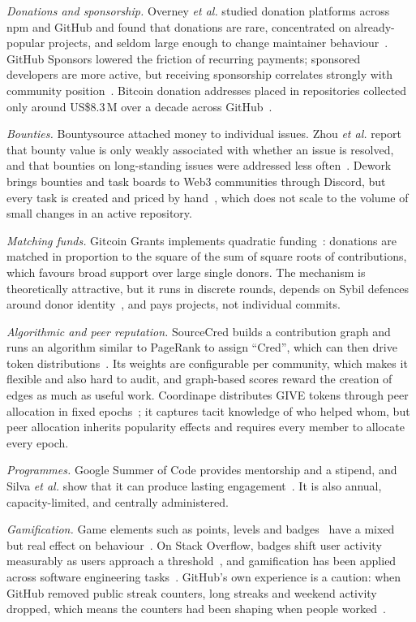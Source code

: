 \documentclass[conference]{IEEEtran}
\begin{document}
\textit{Donations and sponsorship.} Overney \textit{et al.} studied donation platforms across npm and GitHub and found that donations are rare, concentrated on already-popular projects, and seldom large enough to change maintainer behaviour~\cite{overney2020donations}. GitHub Sponsors lowered the friction of recurring payments; sponsored developers are more active, but receiving sponsorship correlates strongly with community position~\cite{shimada2022sponsors}. Bitcoin donation addresses placed in repositories collected only around US\$8.3\,M over a decade across GitHub~\cite{zhauniarovich2019bitcoin}.

\textit{Bounties.} Bountysource attached money to individual issues. Zhou \textit{et al.} report that bounty value is only weakly associated with whether an issue is resolved, and that bounties on long-standing issues were addressed less often~\cite{zhou2021bounty}. Dework brings bounties and task boards to Web3 communities through Discord, but every task is created and priced by hand~\cite{dework}, which does not scale to the volume of small changes in an active repository.

\textit{Matching funds.} Gitcoin Grants implements quadratic funding~\cite{buterin2019qf}: donations are matched in proportion to the square of the sum of square roots of contributions, which favours broad support over large single donors. The mechanism is theoretically attractive, but it runs in discrete rounds, depends on Sybil defences around donor identity~\cite{gitcoin}, and pays projects, not individual commits.

\textit{Algorithmic and peer reputation.} SourceCred builds a contribution graph and runs an algorithm similar to PageRank to assign ``Cred'', which can then drive token distributions~\cite{sourcecred}. Its weights are configurable per community, which makes it flexible and also hard to audit, and graph-based scores reward the creation of edges as much as useful work. Coordinape distributes GIVE tokens through peer allocation in fixed epochs~\cite{coordinape}; it captures tacit knowledge of who helped whom, but peer allocation inherits popularity effects and requires every member to allocate every epoch.

\textit{Programmes.} Google Summer of Code provides mentorship and a stipend, and Silva \textit{et al.} show that it can produce lasting engagement~\cite{silva2020gsoc}. It is also annual, capacity-limited, and centrally administered.

\textit{Gamification.} Game elements such as points, levels and badges~\cite{deterding2011gamification} have a mixed but real effect on behaviour~\cite{hamari2014gamification}. On Stack Overflow, badges shift user activity measurably as users approach a threshold~\cite{anderson2013badges,mamykina2011stackoverflow}, and gamification has been applied across software engineering tasks~\cite{pedreira2015gamification}. GitHub's own experience is a caution: when GitHub removed public streak counters, long streaks and weekend activity dropped, which means the counters had been shaping when people worked~\cite{moldon2021gamification}.
\end{document}
